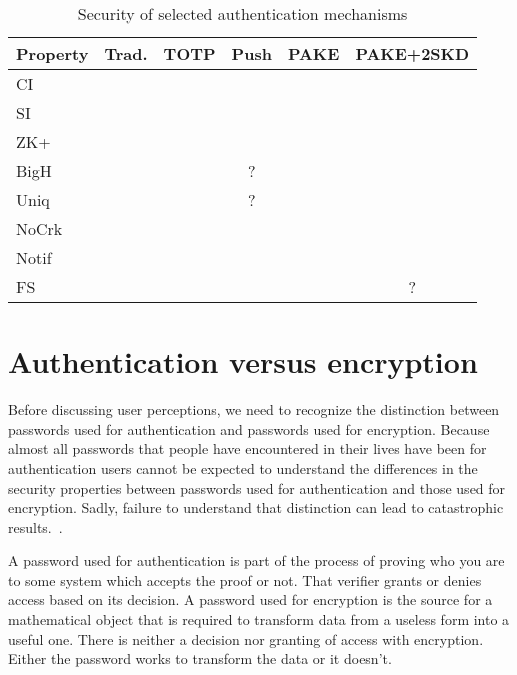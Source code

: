 \documentclass{soups}
\newcommand{\cmark}{\ding{51}}%
\newcommand{\xmark}{\ding{53}}%
\newcommand{\prop}[1]{\textsf{#1}}
\begin{document}
\begin{table}
  \caption{Security of selected authentication mechanisms}\label{tab:props}
  \begin{tabular}{lccccc}
    \textbf{Property} & \textbf{Trad.}   & \textbf{TOTP}    & \textbf{Push}    & \textbf{PAKE}   & \textbf{PAKE+2SKD} \\
    \hline
    \prop{CI}       & \cmark  & \cmark  & \cmark  & \cmark  & \cmark \\
    \prop{SI}       & \xmark  & \xmark  & \xmark  & \cmark  & \cmark \\
    \prop{ZK+}      & \xmark  & \cmark  & \cmark  & \cmark  & \cmark \\
    \prop{BigH}     & \xmark  & \cmark  & ?       & \xmark  & \cmark \\
    \prop{Uniq}     & \xmark  & \cmark  & ?       & \xmark  & \cmark \\
    \prop{NoCrk}    & \xmark  & \xmark  & \xmark  & \xmark  & \cmark \\
    \prop{Notif}    & \xmark  & \xmark  & \cmark  & \xmark  & \xmark \\
    \prop{FS}       & \xmark  & \cmark  & \cmark  & \xmark  & ?
  \end{tabular}
\end{table}

\section{Authentication versus encryption}

Before discussing user perceptions, we need to recognize the distinction between passwords used for authentication and passwords used for encryption.
Because almost all passwords that people have encountered in their lives have been for authentication users cannot be expected to understand the differences in the security properties between passwords used for authentication and those used for encryption.
Sadly, failure to understand that distinction can lead to catastrophic results.~\autocite{Blaze2011:cablegate}.

A password used for authentication is part of the process of proving who you are to some system which accepts the proof or not. That verifier grants or denies access based on its decision. A password used for encryption is the source for a mathematical object that is required to transform data from a useless form into a useful one. There is neither a decision nor granting of access with encryption. Either the password works to transform the data or it doesn't.
\end{document}

